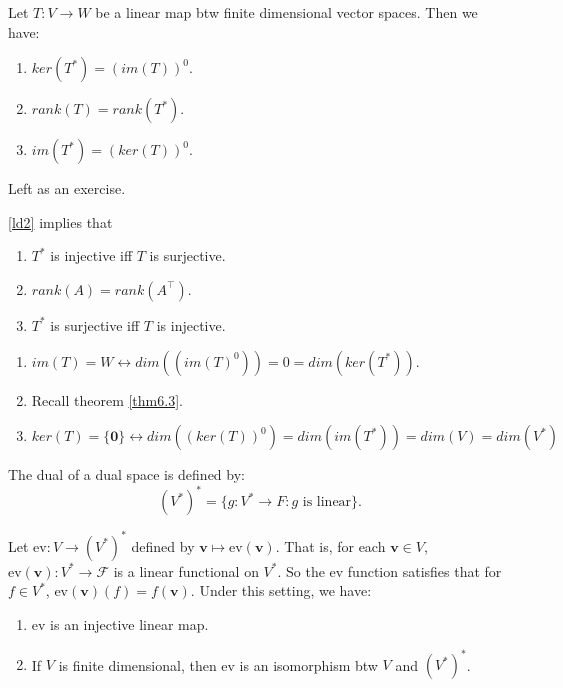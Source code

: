 \begin{theorem}
    Let $T:V\to W$ be a linear map btw finite dimensional vector spaces.
    Then we have:
    \begin{enumerate}
        \item $ker(T^*)=(im(T))^0$.
        \item $rank(T)=rank(T^*)$.
        \item $im(T^*)=(ker(T))^0$.
    \end{enumerate}
    \label{ld2}
\end{theorem}

\begin{pfbox}
    Left as an exercise.
\end{pfbox}

\begin{corollary}
\eqref{ld2} implies that
\begin{enumerate}
    \item $T^*$ is injective iff $T$ is surjective.
    \item $rank(A)=rank(A^\top)$.
    \item $T^*$ is surjective iff $T$ is injective.
\end{enumerate}
\end{corollary}

\begin{pfbox}
\begin{enumerate}
    \item $im(T)=W \leftrightarrow dim((im(T)^0))=0=dim(ker(T^*))$.
    \item Recall theorem \eqref{thm6.3}.
    \item $ker(T)=\{\mathbf{0}\}\leftrightarrow dim((ker(T))^0)= dim(im(T^*)) = dim(V)=dim(V^*)$
\end{enumerate}
\end{pfbox}


\begin{definition}
The dual of a dual space is defined by:
\[(V^*)^*=\{g:V^*\to F: g \text{ is linear}\}.\]
\end{definition}

\begin{theorem}
    Let $\text{ev}: V\to (V^*)^*$ defined by $\mathbf{v}\mapsto\text{ev}(\mathbf{v})$.
    That is, for each $\mathbf{v}\in V$, $\text{ev}(\mathbf{v}):V^*\to \mathcal{F}$ is a linear functional on $V^*$.
    So the ev function satisfies that for $f\in V^*$, ev$(\mathbf{v})(f)=f(\mathbf{v}).$
    Under this setting, we have:
    \begin{enumerate}
        \item ev is an injective linear map.
        \item If $V$ is finite dimensional, then ev is an isomorphism btw $V$ and $(V^*)^*$.
    \end{enumerate}
\end{theorem}

